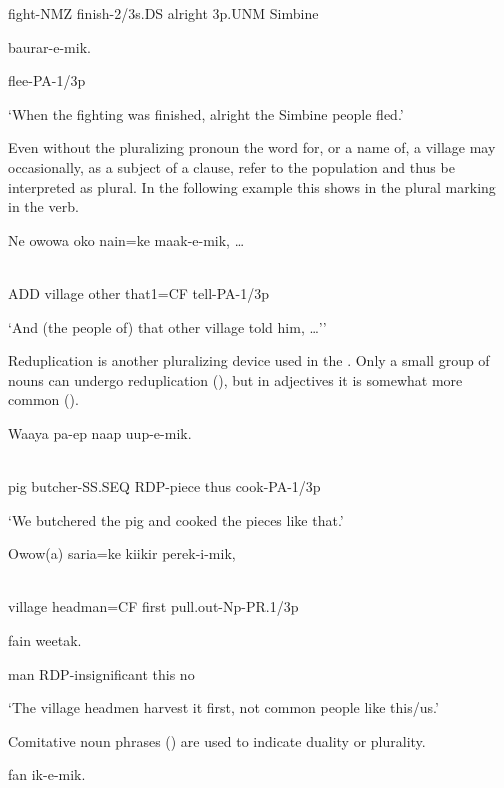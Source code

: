 fight-NMZ  finish-2/3s.DS  alright  3p.UNM  Simbine

baurar-e-mik.

flee-PA-1/3p

`When the fighting was finished, alright the Simbine people fled.'

Even without the pluralizing pronoun the word for, or a name of, a village may occasionally, as a subject of a clause, refer to the population and thus be interpreted as plural. In the following example this shows in the plural marking in the verb. 

\ea%
\label{ex:x1307}
\gll Ne  owowa  oko  nain=ke  maak-e-mik,  {\dots} \\
      \\
\glt
\z

ADD  village  other  that1=CF  tell-PA-1/3p

`And (the people of) that other village told him, {\dots}''

Reduplication is another pluralizing device used in the . Only a small group of nouns can undergo reduplication (), but in adjectives it is somewhat more common ().

\ea%
\label{ex:x1290}
\gll Waaya  pa-ep    naap  uup-e-mik. \\
      \\
\glt
\z

pig  butcher-SS.SEQ  RDP-piece  thus  cook-PA-1/3p

`We butchered the pig and cooked the pieces like that.'

\ea%
\label{ex:x1291}
\gll Owow(a)  saria=ke  kiikir  perek-i-mik, \\
      \\
\glt
\z

village  headman=CF  first  pull.out-Np-PR.1/3p

    fain  weetak.

man  RDP-insignificant  this  no

`The village headmen harvest it first, not common people like this/us.'

Comitative noun phrases () are used to indicate duality or plurality. 

\ea%
\label{ex:x1292}
\gll {}  fan  ik-e-mik. \\
      \\
\glt
\z

